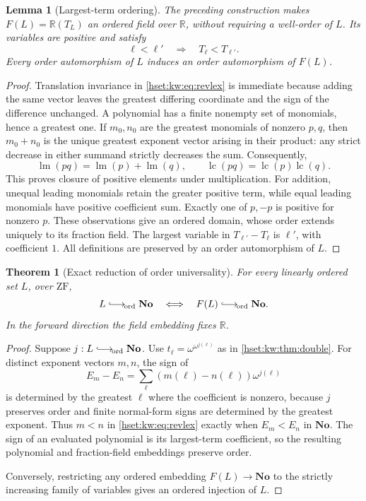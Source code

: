 \documentclass[11pt,letterpaper]{article}
\newtheorem{theorem}{Theorem}[section]
\newtheorem{lemma}[lemma]{Lemma}\aliascntresetthe{lemma}
\theoremstyle{definition}
\theoremstyle{remark}
\newcommand{\No}{\mathbf{No}}
\newcommand{\ZF}{\mathrm{ZF}}
\newcommand{\R}{\mathbb R}
\newcommand{\lc}{\operatorname{lc}}
\newcommand{\lm}{\operatorname{lm}}
\newcommand{\hookord}{\mathrel{\lhook\joinrel\longrightarrow_{\!\mathrm{ord}}}}
\begin{document}
\begin{lemma}[Largest-term ordering]\label{hset:kw:lem:orderedfield}
The preceding construction makes $F(L)=\R(T_L)$ an ordered field over $\R$, without requiring a well-order of $L$. Its variables are positive and satisfy
\[
\ell<\ell'\quad\Longrightarrow\quad T_\ell<T_{\ell'}.
\]
Every order automorphism of $L$ induces an order automorphism of $F(L)$.
\end{lemma}
\begin{proof}
Translation invariance in \eqref{hset:kw:eq:revlex} is immediate because adding the same vector leaves the greatest differing coordinate and the sign of the difference unchanged. A polynomial has a finite nonempty set of monomials, hence a greatest one. If $m_0,n_0$ are the greatest monomials of nonzero $p,q$, then $m_0+n_0$ is the unique greatest exponent vector arising in their product: any strict decrease in either summand strictly decreases the sum. Consequently,
\[
\lm(pq)=\lm(p)+\lm(q),\qquad \lc(pq)=\lc(p)\lc(q).
\]
This proves closure of positive elements under multiplication. For addition, unequal leading monomials retain the greater positive term, while equal leading monomials have positive coefficient sum. Exactly one of $p,-p$ is positive for nonzero $p$. These observations give an ordered domain, whose order extends uniquely to its fraction field. The largest variable in $T_{\ell'}-T_\ell$ is $\ell'$, with coefficient $1$. All definitions are preserved by an order automorphism of $L$.
\end{proof}

\begin{theorem}[Exact reduction of order universality]\label{hset:kw:thm:order}
For every linearly ordered set $L$, over $\ZF$,
\[
L\hookord\No
\quad\Longleftrightarrow\quad
F(L)\hookord\No.
\]
In the forward direction the field embedding fixes $\R$.
\end{theorem}
\begin{proof}
Suppose $j:L\hookord\No$. Use $t_\ell=\omega^{\omega^{j(\ell)}}$ as in \cref{hset:kw:thm:double}. For distinct exponent vectors $m,n$, the sign of
\[
E_m-E_n=\sum_\ell(m(\ell)-n(\ell))\omega^{j(\ell)}
\]
is determined by the greatest $\ell$ where the coefficient is nonzero, because $j$ preserves order and finite normal-form signs are determined by the greatest exponent. Thus $m<n$ in \eqref{hset:kw:eq:revlex} exactly when $E_m<E_n$ in $\No$. The sign of an evaluated polynomial is its largest-term coefficient, so the resulting polynomial and fraction-field embeddings preserve order.

Conversely, restricting any ordered embedding $F(L)\to\No$ to the strictly increasing family of variables gives an ordered injection of $L$.
\end{proof}
\end{document}
